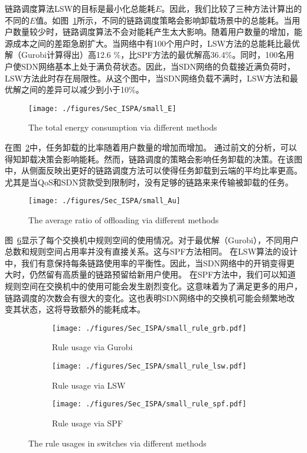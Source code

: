 链路调度算法LSW的目标是最小化总能耗$E$。因此，我们比较了三种方法计算出的不同的$E$值。如图~\ref{fig_smallE}所示，不同的链路调度策略会影响卸载场景中的总能耗。当用户数量较少时，链路调度算法不会对能耗产生太大影响。随着用户数量的增加，能源成本之间的差距急剧扩大。当网络中有100个用户时，LSW方法的总能耗比最优解（Gurobi计算得出）高12.6 \%，比SPF方法的最优解高36.4\%。同时，100名用户使SDN网络基本上处于满负荷状态。因此，当SDN网络的负载接近满负荷时，LSW方法此时存在局限性。从这个图中，当SDN网络负载不满时，LSW方法和最优解之间的差异可以减少到小于10\%。

\begin{figure}[!h]
\centering
\texttt{[image: ./figures/Sec\_ISPA/small\_E]}
\vspace{-1em}
\caption{The total energy consumption via different methods}
\vspace{-0.5em}
\label{fig_smallE}
\end{figure}

在图~\ref{fig_smallAu}中，任务卸载的比率随着用户数量的增加而增加。 通过前文的分析，可以得知卸载决策会影响能耗。然而，链路调度的策略会影响任务卸载的决策。在该图中，从侧面反映出更好的链路调度方法可以使得任务卸载到云端的平均比率更高。尤其是当QoS和SDN贷款受到限制时，没有足够的链路来来传输被卸载的任务。

\begin{figure}[!h]
\centering
\texttt{[image: ./figures/Sec\_ISPA/small\_Au]}
\vspace{-1em}
\caption{The average ratio of offloading via different methods}
\vspace{-1.5em}
\label{fig_smallAu}
\end{figure}

图~\ref{fig_smallrule}显示了每个交换机中规则空间的使用情况。对于最优解（Gurobi），不同用户总数和规则空间占用率并没有直接关系。这与SPF方法相同。 在LSW算法的设计中，我们有意保持每条链路使用率的平衡性。因此，当SDN网络中的开销变得更大时，仍然留有高质量的链路预留给新用户使用。 在SPF方法中，我们可以知道规则空间在交换机中的使用可能会发生剧烈变化。这意味着为了满足更多的用户，链路调度的次数会有很大的变化。这也表明SDN网络中的交换机可能会频繁地改变其状态，这将导致额外的能耗成本。

\begin{figure}[!h]
  \centering
  \begin{subfigure}[b]{0.32\linewidth}
    \texttt{[image: ./figures/Sec\_ISPA/small\_rule\_grb.pdf]}
    \label{fig_smallNetworkRG}
    \caption{Rule usage via Gurobi}
  \end{subfigure}
  \begin{subfigure}[b]{0.32\linewidth}
    \texttt{[image: ./figures/Sec\_ISPA/small\_rule\_lsw.pdf]}
    \label{fig_smallNetworkRL}
    \caption{Rule usage via LSW}
  \end{subfigure}
  \begin{subfigure}[b]{0.32\linewidth}
    \texttt{[image: ./figures/Sec\_ISPA/small\_rule\_spf.pdf]}
    \label{fig_smallNetworkRS}
    \caption{Rule usage via SPF}
  \end{subfigure}
  \caption{The rule usages in switches via different methods}
  \label{fig_smallrule}
\end{figure}

